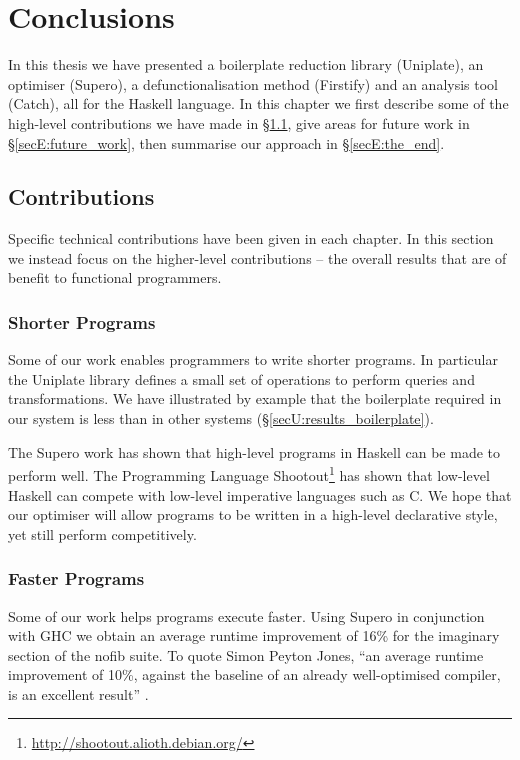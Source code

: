 

\chapter{Conclusions}
\label{chp:conclusions}

In this thesis we have presented a boilerplate reduction library (Uniplate), an optimiser (Supero), a defunctionalisation method (Firstify) and an analysis tool (Catch), all for the Haskell language. In this chapter we first describe some of the high-level contributions we have made in \S\ref{secE:contributions}, give areas for future work in \S\ref{secE:future_work}, then summarise our approach in \S\ref{secE:the_end}.


\section{Contributions}
\label{secE:contributions}

Specific technical contributions have been given in each chapter. In this section we instead focus on the higher-level contributions -- the overall results that are of benefit to functional programmers.

\subsection{Shorter Programs}

Some of our work enables programmers to write shorter programs. In particular the Uniplate library defines a small set of operations to perform queries and transformations. We have illustrated by example that the boilerplate required in our system is less than in other systems (\S\ref{secU:results_boilerplate}).

The Supero work has shown that high-level programs in Haskell can be made to perform well. The Programming Language Shootout\footnote{\url{http://shootout.alioth.debian.org/}} has shown that low-level Haskell can compete with low-level imperative languages such as C. We hope that our optimiser will allow programs to be written in a high-level declarative style, yet still perform competitively.

\subsection{Faster Programs}

Some of our work helps programs execute faster. Using Supero in conjunction with GHC we obtain an average runtime improvement of 16\% for the imaginary section of the nofib suite. To quote Simon Peyton Jones, ``an average runtime improvement of 10\%, against the baseline of an already well-optimised compiler, is an excellent result'' \cite{spj:specconstr}.

